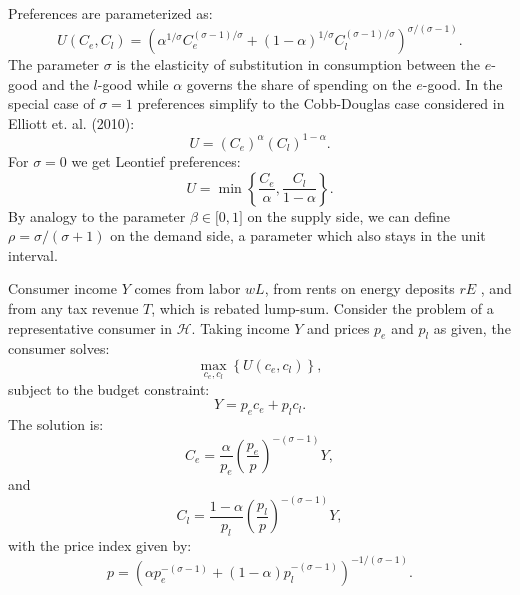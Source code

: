 \documentclass[notitlepage,12pt]{article}
\begin{document}
Preferences are parameterized as:%
\begin{equation}
U(C_{e},C_{l})=\left( \alpha ^{1/\sigma }C_{e}^{(\sigma -1)/\sigma }+\left(
1-\alpha \right) ^{1/\sigma }C_{l}^{(\sigma -1)/\sigma }\right) ^{\sigma
/(\sigma -1)}.  \label{preferences}
\end{equation}%
The parameter $\sigma $ is the elasticity of substitution in consumption
between the $e$-good and the $l$-good while $\alpha $ governs the share of
spending on the $e$-good. In the special case of $\sigma =1$ preferences
simplify to the Cobb-Douglas case considered in Elliott et. al. (2010):%
\begin{equation*}
U=\left( C_{e}\right) ^{\alpha }\left( C_{l}\right) ^{1-\alpha }.
\end{equation*}%
For $\sigma =0$ we get Leontief preferences:%
\begin{equation*}
U=\min \left\{ \frac{C_{e}}{\alpha },\frac{C_{l}}{1-\alpha }\right\} .
\end{equation*}%
By analogy to the parameter $\beta \in \lbrack 0,1]$ on the supply side, we
can define $\rho =\sigma /(\sigma +1)$ on the demand side, a parameter which
also stays in the unit interval.

Consumer income $Y$ comes from labor $wL$, from rents on energy deposits $rE$%
, and from any tax revenue $T$, which is rebated lump-sum. Consider the
problem of a representative consumer in $\mathcal{H}$. Taking income $Y$ and
prices $p_{e}$ and $p_{l}$ as given, the consumer solves:%
\begin{equation*}
\max_{c_{e},c_{l}}\left\{ U(c_{e},c_{l})\right\} ,
\end{equation*}%
subject to the budget constraint:%
\begin{equation*}
Y=p_{e}c_{e}+p_{l}c_{l}.
\end{equation*}%
The solution is:%
\begin{equation*}
C_{e}=\frac{\alpha }{p_{e}}\left( \frac{p_{e}}{p}\right) ^{-(\sigma -1)}Y,
\end{equation*}%
and%
\begin{equation*}
C_{l}=\frac{1-\alpha }{p_{l}}\left( \frac{p_{l}}{p}\right) ^{-(\sigma -1)}Y,
\end{equation*}%
with the price index given by:%
\begin{equation}
p=\left( \alpha p_{e}^{-(\sigma -1)}+(1-\alpha )p_{l}^{-(\sigma -1)}\right)
^{-1/(\sigma -1)}.  \label{aggregate price index}
\end{equation}
\end{document}

